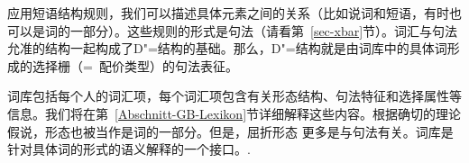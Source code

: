 应用短语结构规则，我们可以描述具体元素之间的关系（比如说词和短语，有时也可以是词的一部分）。这些规则的形式是\xbar 句法（请看第~\ref{sec-xbar}节）。词汇与\xbar 句法允准的结构一起构成了D"=结构的基础。那么，D"=结构就是由词库中的具体词形成的选择栅（=~配价类型）的句法表征。

词库包括每个人的词汇项，每个词汇项包含有关形态结构、句法特征和选择属性等信息。我们将在第~\ref{Abschnitt-GB-Lexikon}节详细解释这些内容。根据确切的理论假说，形态也被当作是词的一部分。但是，屈折形态 更多是与句法有关。词库是针对具体词的形式的语义解释的一个接口。.

